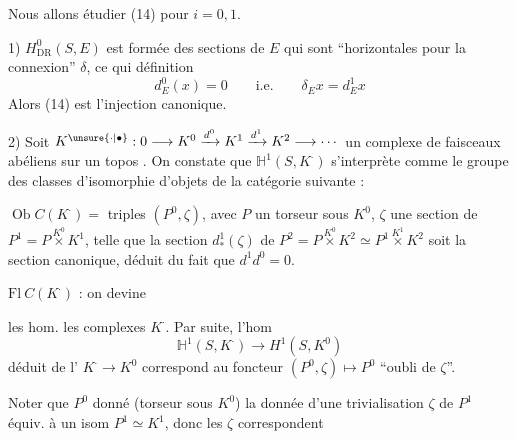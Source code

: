 Nous allons étudier (14) pour $i=0,1$.

1) $H^0_{\mathrm{DR}}(S,E)$ est formée des sections  de $E$ qui sont
``horizontales pour la connexion'' $\delta$, ce qui 
définition 
\[
d_E^0(x)=0\qquad\text{i.e.}\qquad\delta_E x=d_E^1x \tag*{(16)}
\]
Alors (14) est l'injection canonique.


2) Soit $K^{\unsure{\cdot|\bullet}}:0\longrightarrow K^0\xrightarrow{d^0}K^1\xrightarrow{d^1}K^2\longrightarrow\cdots$
un complexe  
de faisceaux abéliens sur un topos . On constate que
$\mathbb H^1(S,K^{\cdot})$ s'interprète comme le groupe des
classes d'isomorphie  d'objets de la catégorie suivante  :

$\operatorname{Ob} C(K^{\cdot})=$ triples $(P^0,\zeta)$, avec $P$ un torseur sous $K^0$,
$\zeta$ une section de $P^1=P\mathbin{\overset{K^0}{\times}}K^1$, telle que la section
 $d^1_*(\zeta)$ de $P^2=P\mathbin{\overset{K^0}{\times}}K^2\simeq
P^1\mathbin{\overset{K^1}{\times}}K^2$ soit la section
canonique,  déduit du fait que $d^1d^0=0$.

$\mathrm{Fl}\ C(K^{\cdot})$ : on devine

les hom.  les complexes $K^{\cdot}$. Par suite,
l'hom  
\[
\mathbb H^1(S,K^{\cdot})\longrightarrow H^1(S,K^0)
\]
déduit de l' $K^{\cdot}\longrightarrow K^0$ correspond au
foncteur $(P^0,\zeta)\longmapsto P^0$ ``oubli de $\zeta$''.

Noter que  $P^0$ donné (torseur sous $K^0$) la
donnée d'une trivialisation $\zeta$ de $P^1$ équiv. à un isom
$P^1\simeq K^1$, donc les $\zeta$ correspondent 
